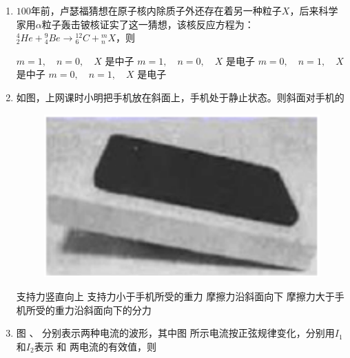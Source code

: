 




\gaokaoxz


\begin{enumerate}
	\item
	$ 100 $年前，卢瑟福猜想在原子核内除质子外还存在着另一种粒子$ X $，后来科学家用$ \alpha $粒子轰击铍核证实了这一猜想，该核反应方程为：${ }_{2}^{4} He+{ }_{4}^{9} Be \rightarrow{ }_{6}^{12} C+{ }_{n}^{m} X$，则 

 

\fourchoices
{$m=1, \quad n=0, \quad X$ 是中子}
{$m=1, \quad n=0, \quad X$ 是电子}
{$m=0, \quad n=1, \quad X$ 是中子}
{$m=0, \quad n=1, \quad X$ 是电子}



\item
如图，上网课时小明把手机放在斜面上，手机处于静止状态。则斜面对手机的  
\begin{figure}[h!]
	\centering
	\includegraphics[width=0.18\linewidth]{picture/screenshot092}
\end{figure}

\fourchoices
{支持力竖直向上}
{支持力小于手机所受的重力}
{摩擦力沿斜面向下}
{摩擦力大于手机所受的重力沿斜面向下的分力}



\item
图  、  分别表示两种电流的波形，其中图  所示电流按正弦规律变化，分别用$ I_{1} $和$ I_{2} $表示  和  两电流的有效值，则  
\begin{figure}[h!]
	\centering
	\begin{subfigure}{0.4\linewidth}
		\centering
		 
		\caption{}\label{2020海南3a}
	\end{subfigure}
	\begin{subfigure}{0.4\linewidth}
		\centering
		 
		\caption{}\label{2020海南3b}
	\end{subfigure}
\end{figure}



\end{enumerate}
